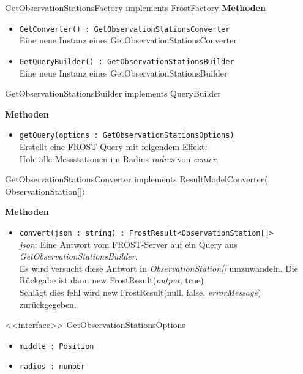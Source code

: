 \begin{Class}{GetObservationStationsFactory implements FrostFactory}
    \textbf{Methoden}
    \begin{itemize}
        \item \texttt{GetConverter() : GetObservationStationsConverter}
        \\ Eine neue Instanz eines GetObservationStationsConverter
        \item \texttt{GetQueryBuilder() : GetObservationStationsBuilder}
        \\ Eine neue Instanz eines GetObservationStationsBuilder
    \end{itemize}
\end{Class}

\begin{Class}{GetObservationStationsBuilder implements QueryBuilder}

    \textbf{Methoden}
    \begin{itemize}
        \item \texttt{getQuery(options : GetObservationStationsOptions)}
        \\ Erstellt eine FROST-Query mit folgendem Effekt:
        \\ Hole alle Messstationen im Radius \emph{radius} von \emph{center}.
    \end{itemize}
\end{Class}

\begin{Class}{GetObservationStationsConverter implements ResultModelConverter$\langle$ObservationStation$\lbrack\rbrack\rangle$}

    \textbf{Methoden}
    \begin{itemize}
        \item \texttt{convert(json : string) : FrostResult<ObservationStation[]>}
        \\ \emph{json}: Eine Antwort vom FROST-Server auf ein Query aus \emph{GetObservationStationsBuilder}.
        \\ Es wird versucht diese Antwort in \emph{ObservationStation[]} umzuwandeln.
        Die Rückgabe ist dann new FrostResult(\emph{output}, true)
        \\ Schlägt dies fehl wird new FrostResult(null, false, \emph{errorMessage}) zurückgegeben.
    \end{itemize}
\end{Class}

\begin{Class}{<<interface>> GetObservationStationsOptions}
    \begin{itemize}
        \item \texttt{middle : Position}
        \item \texttt{radius : number}
    \end{itemize}
\end{Class}

